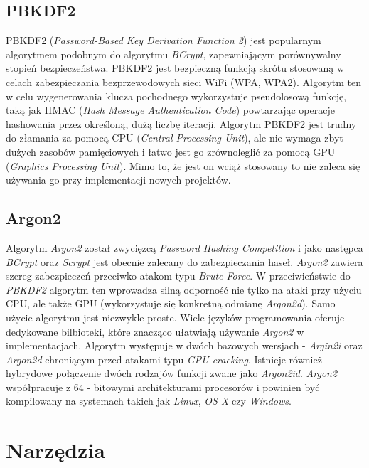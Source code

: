 \subsection{PBKDF2}
PBKDF2 (\textit{Password-Based Key Derivation Function 2}) jest popularnym algorytmem podobnym do algorytmu \textit{BCrypt}, zapewniającym porównywalny stopień bezpieczeństwa. PBKDF2 jest bezpieczną funkcją skrótu stosowaną w celach zabezpieczania bezprzewodowych sieci WiFi (WPA, WPA2). Algorytm ten w celu wygenerowania klucza pochodnego wykorzystuje pseudolosową funkcję, taką jak HMAC (\textit{Hash Message Authentication Code}) powtarzając operacje hashowania przez określoną, dużą liczbę iteracji. Algorytm PBKDF2 jest trudny do złamania za pomocą CPU (\textit{Central Processing Unit}), ale nie wymaga zbyt dużych zasobów pamięciowych i łatwo jest go zrównoleglić za pomocą GPU (\textit{Graphics Processing Unit}). Mimo to, że jest on wciąż stosowany to nie zaleca się używania go przy implementacji nowych projektów. 

\subsection{Argon2}
Algorytm \textit{Argon2} został zwycięzcą \textit{Password Hashing Competition} i jako następca \textit{BCrypt} oraz \textit{Scrypt} jest obecnie zalecany do zabezpieczania haseł. \textit{Argon2} zawiera szereg zabezpieczeń przeciwko atakom typu \textit{Brute Force}. W przeciwieństwie do \textit{PBKDF2} algorytm ten wprowadza silną odporność nie tylko na ataki przy użyciu CPU, ale także GPU (wykorzystuje się konkretną odmianę \textit{Argon2d}). Samo użycie algorytmu jest niezwykle proste. Wiele języków programowania oferuje dedykowane bilbioteki, które znacząco ułatwiają używanie \textit{Argon2} w implementacjach. Algorytm występuje w dwóch bazowych wersjach - \textit{Argin2i} oraz \textit{Argon2d} chroniącym przed atakami typu \textit{GPU cracking}. Istnieje również hybrydowe połączenie dwóch rodzajów funkcji zwane jako \textit{Argon2id}. \textit{Argon2} współpracuje z 64 - bitowymi architekturami procesorów i powinien być kompilowany na systemach takich jak \textit{Linux}, \textit{OS X} czy \textit{Windows}. 

\section{Narzędzia}
